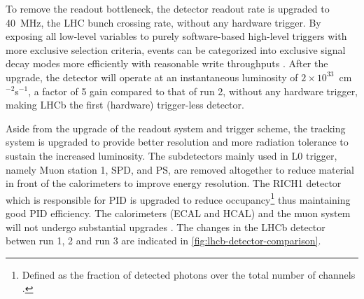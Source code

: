 To remove the readout bottleneck,
the detector readout rate is upgraded to 40~MHz,
the LHC bunch crossing rate,
without any hardware trigger.
By exposing all low-level variables to purely software-based high-level
triggers with more exclusive selection criteria,
events can be categorized into exclusive signal decay modes more
efficiently with reasonable write throughputs \cite{Albrecht_2014}.
After the upgrade, the detector will operate at an instantaneous luminosity
of $2 \times 10^{33}$~cm$^{-2}$s$^{-1}$,
a factor of 5 gain compared to that of run 2,
without any hardware trigger,
making LHCb the first (hardware) trigger-less detector.

Aside from the upgrade of the readout system and trigger scheme,
the tracking system is upgraded to provide better resolution and more
radiation tolerance to sustain the increased luminosity.
The subdetectors mainly used in L0 trigger, namely Muon station 1, SPD, and PS,
are removed altogether to reduce material in front of the calorimeters to
improve energy resolution.
The RICH1 detector which is responsible for PID is upgraded to reduce
occupancy\footnote{
    Defined as the fraction of detected photons over the total number of
    channels
    \cite{D_Ambrosio_2017}.
}
thus maintaining good PID efficiency.
The calorimeters (ECAL and HCAL) and the muon system will not undergo
substantial upgrades
\cite{Piucci_2017}.
The changes in the LHCb detector betwen run 1, 2 and run 3 are indicated
in \cref{fig:lhcb-detector-comparison}.


